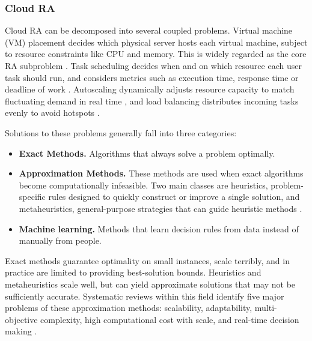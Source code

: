 \documentclass[12pt]{article}
\begin{document}
\subsubsection{Cloud RA}
Cloud RA can be decomposed into several coupled problems. Virtual machine (VM) placement decides which physical server hosts each virtual machine, subject to resource constraints like CPU and memory. This is widely regarded as the core RA subproblem \cite{saidi2023}. Task scheduling decides when and on which resource each user task should run, and considers metrics such as execution time, response time or deadline of work \cite{lbts2024}. Autoscaling dynamically adjusts resource capacity to match fluctuating demand in real time \cite{autoscaling2023}, and load balancing distributes incoming tasks evenly to avoid hotspots \cite{lb2024}.

Solutions to these problems generally fall into three categories:
\begin{itemize}
    \item \textbf{Exact Methods.} Algorithms that always solve a problem optimally.
    \item \textbf{Approximation Methods.} These methods are used when exact algorithms become computationally infeasible. Two main classes are heuristics, problem-specific rules designed to quickly construct or improve a single solution, and metaheuristics, general-purpose strategies that can guide heuristic methods \cite{alkhalifa2025comparative}.
    \item \textbf{Machine learning.} Methods that learn decision rules from data instead of manually from people.
\end{itemize}

Exact methods guarantee optimality on small instances, scale terribly, and in practice are limited to providing best-solution bounds. Heuristics and metaheuristics scale well, but can yield approximate solutions that may not be sufficiently accurate. Systematic reviews within this field identify five major problems of these approximation methods: scalability, adaptability, multi-objective complexity, high computational cost with scale, and real-time decision making \cite{mohamaddiah2014, lbts2024, 10854610, DAHMANI2025100616, ml_ra_litrev2025, hu2021attend2pack}.
\end{document}
